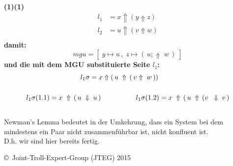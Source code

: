 \documentclass{article}
\begin{document}
		\textbf{(1)(1)}
			\begin{align*}
				l_1 &= x \Uparrow ( y \Uparrow z)  \\
				l_2 &= u \Uparrow ( v \Uparrow w)  \\
			\end{align*}
		\textbf{damit:}
			\[
				mgu = [\;y \mapsto u\,,\;z \mapsto (\,u;\Uparrow\;w\,)\;]
			\]
		\textbf{und die mit dem MGU substituierte Seite $l_1$:}
			\begin{align*}
				l_1\sigma = x \Uparrow (\,u\;&\Uparrow\,(\,v\Uparrow\;w\,))\\ \\
				l_1\sigma (1.1) = x\;\Uparrow \, ( \, u \; \Downarrow \; u\,)
				\hspace{1cm}&\hspace{8mm}
				l_1\sigma (1.2) = x\;\Uparrow \, ( \, u \; \Uparrow \,(v\;\;\Downarrow\;v\,) \\\\
				
			\end{align*}
		Newman's Lemma bedeutet in der Umkehrung, dass ein System bei dem mindestens ein Paar nicht zusammenf\"uhrbar ist, nicht konfluent ist.\\
		D.h. wir sind hier bereits fertig.
		
		
		
		
		
		
		
		
		
	
		
		
		
	\begin{tiny}
	\copyright\ Joint-Troll-Expert-Group (JTEG) 2015
	\end{tiny}
\end{document}
